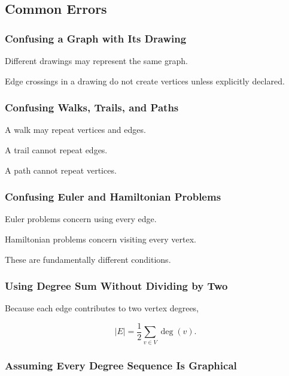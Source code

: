\subsection{Common Errors}
\label{subsec:graph-theory-common-errors}

\subsubsection{Confusing a Graph with Its Drawing}

Different drawings may represent the same graph.

Edge crossings in a drawing do not create vertices unless explicitly
declared.

\subsubsection{Confusing Walks, Trails, and Paths}

A walk may repeat vertices and edges.

A trail cannot repeat edges.

A path cannot repeat vertices.

\subsubsection{Confusing Euler and Hamiltonian Problems}

Euler problems concern using every edge.

Hamiltonian problems concern visiting every vertex.

These are fundamentally different conditions.

\subsubsection{Using Degree Sum Without Dividing by Two}

Because each edge contributes to two vertex degrees,

\[
|E|
=
\frac12
\sum_{v\in V}\deg(v).
\]

\subsubsection{Assuming Every Degree Sequence Is Graphical}

